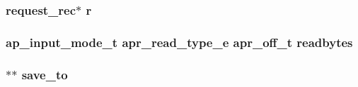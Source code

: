 \subsubsection[{\texorpdfstring{r}{r}}]{ {\bf request\+\_\+rec}$\ast$ r}\hypertarget{group__APACHE__CORE__FILTER_gaedf2e57576fb94c7e1bbe1ba20df39d4}{}\label{group__APACHE__CORE__FILTER_gaedf2e57576fb94c7e1bbe1ba20df39d4}
\subsubsection[{\texorpdfstring{readbytes}{readbytes}}]{ {\bf ap\+\_\+input\+\_\+mode\+\_\+t} {\bf apr\+\_\+read\+\_\+type\+\_\+e} {\bf apr\+\_\+off\+\_\+t} readbytes}\hypertarget{group__APACHE__CORE__FILTER_ga0ce3dc88443223a04b0d1a3167356aee}{}\label{group__APACHE__CORE__FILTER_ga0ce3dc88443223a04b0d1a3167356aee}
\subsubsection[{\texorpdfstring{save\+\_\+to}{save_to}}]{$\ast$$\ast$ save\+\_\+to}\hypertarget{group__APACHE__CORE__FILTER_ga723cf02e42fc5bf4de0a3e2518407fc1}{}\label{group__APACHE__CORE__FILTER_ga723cf02e42fc5bf4de0a3e2518407fc1}
